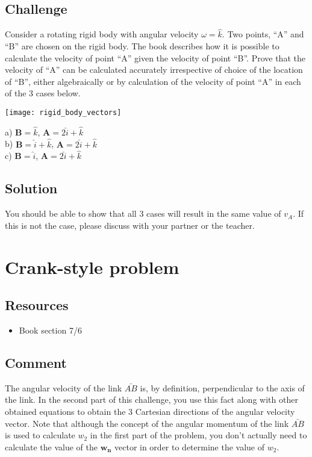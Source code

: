 \subsection*{Challenge}
Consider a rotating rigid body with angular velocity $\omega=\hat{k}$. Two points, ``A'' and ``B'' are chosen on the rigid body. The book describes how it is possible to calculate the velocity of point ``A'' given the velocity of point ``B''. Prove that the velocity of ``A'' can be calculated accurately irrespective of choice of the location of ``B'', either algebraically or by calculation of the velocity of point ``A'' in each of the 3 cases below.

\texttt{[image: rigid\_body\_vectors]}

a) $\bm{B} = \hat{k}$,              $\bm{A} = 2 \hat{i} + \hat{k}$\\
b) $\bm{B} = \hat{i} + \hat{k}$,    $\bm{A} = 2 \hat{i} + \hat{k}$\\
c) $\bm{B} = \hat{i}$,              $\bm{A} = 2 \hat{i} + \hat{k}$

\subsection*{Solution}
You should be able to show that all 3 cases will result in the same value of $v_A$. If this is not the case, please discuss with your partner or the teacher.




\newpage
\section{Crank-style problem}

\subsection*{Resources}
\begin{itemize}
    \item Book section 7/6
\end{itemize}

\subsection*{Comment}
The angular velocity of the link $\bar{AB}$ is, by definition, perpendicular to the axis of the link. In the second part of this challenge, you use this fact along with other obtained equations to obtain the 3 Cartesian directions of the angular velocity vector. Note that although the concept of the angular momentum of the link $\bar{AB}$ is used to calculate $w_2$ in the first part of the problem, you don't actually need to calculate the value of the $\bm{w_n}$ vector in order to determine the value of $w_2$.

